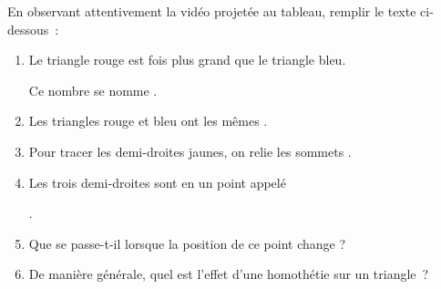 \documentclass[activite]{thedocument}
\begin{document}
    \begin{center}
    \end{center}
    \noindent En observant attentivement la vidéo projetée au tableau,
    remplir le texte ci-dessous~:
    \begin{enumerate}
        \item Le triangle rouge est  fois plus grand que le triangle
        bleu.\par\noindent Ce nombre se nomme .
        \item Les triangles rouge et bleu ont les mêmes .
        \item Pour tracer les demi-droites jaunes, on relie les sommets
        .
        \item Les trois demi-droites sont  en un point
        appelé \par\noindent{}.
        \item Que se passe-t-il lorsque la position de ce point change ?
        \answerspace{5em}
        \item De manière générale, quel est l'effet d'une homothétie sur un triangle~?
        \answerspace{5em}
    \end{enumerate}
\end{document}
